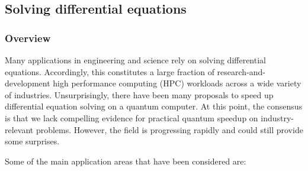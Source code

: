
\begin{refsection}

\section{Solving differential equations}\label{appl:DiffEq}




\subsubsection*{Overview}



Many applications in engineering and science rely on solving differential equations. Accordingly, this constitutes a large fraction of research-and-development high performance computing (HPC) workloads across a wide variety of industries. Unsurprisingly, there have been many proposals to speed up differential equation solving on a quantum computer. At this point, the consensus is that we lack compelling evidence for practical quantum speedup on industry-relevant problems. However, the field is progressing rapidly and could still provide some surprises. 

Some of the main application areas that have been considered are: 


\end{refsection}
